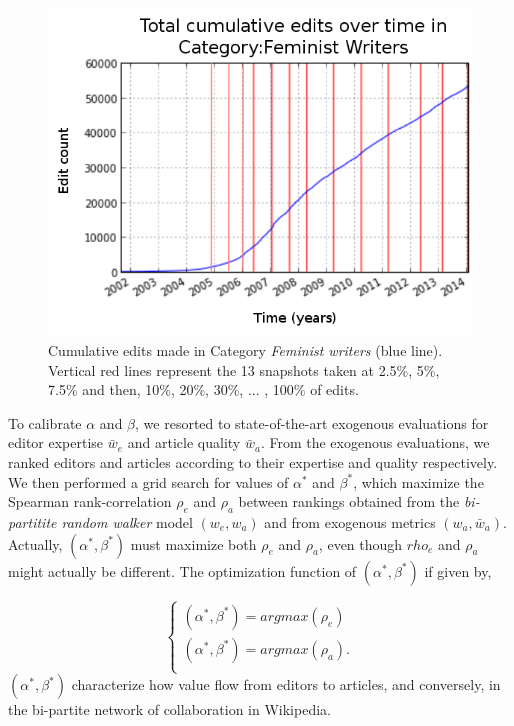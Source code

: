 \begin{figure}[!t]
\centering
\includegraphics[width=0.9\columnwidth]{../Figures/cumulative_snapshots_Feminist_Writers_thirteen.png}
\caption{Cumulative edits made in Category {\it Feminist writers} (blue line). Vertical red lines represent the 13 snapshots taken at 2.5\%, 5\%, 7.5\% and then, 10\%, 20\%, 30\%, $...$ , 100\% of edits.}
\label{fig:snapshots}
\end{figure}

To calibrate $\alpha$ and $\beta$, we resorted to state-of-the-art exogenous evaluations for editor expertise $\bar{w}_e$ and article quality $\bar{w}_a$. From the exogenous evaluations, we ranked editors and articles according to their expertise and quality respectively. We then performed  a grid search for values of $\alpha^*$ and $\beta^*$, which maximize the Spearman rank-correlation $\rho_e$ and $\rho_a$ between rankings obtained from the {\it bi-partitite random walker} model $(w_e,w_a)$ and from exogenous metrics $(w_a,\bar{w}_a)$. Actually, $(\alpha^*,\beta^*)$ must maximize both $\rho_e$ and $\rho_a$, even though $rho_e$ and $\rho_a$ might actually be different. The optimization function  of $(\alpha^*,\beta^*)$ if given by,

\begin{equation}
\begin{cases}
(\alpha^*,\beta^*) = argmax(\rho_e)\\
(\alpha^*,\beta^*) = argmax(\rho_a).\\
\end{cases}
\end{equation}
$(\alpha^*,\beta^*)$ characterize how value flow from editors to articles, and conversely, in the bi-partite network of collaboration in Wikipedia.

